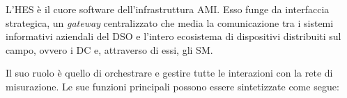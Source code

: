 










L'HES è il cuore software dell'infrastruttura AMI. Esso funge da interfaccia strategica, un \textit{gateway} centralizzato che media la comunicazione tra i sistemi informativi aziendali del DSO e l'intero ecosistema di dispositivi distribuiti sul campo, ovvero i DC e, attraverso di essi, gli SM.


Il suo ruolo è quello di orchestrare e gestire tutte le interazioni con la rete di misurazione. 
Le sue funzioni principali possono essere sintetizzate come segue:


